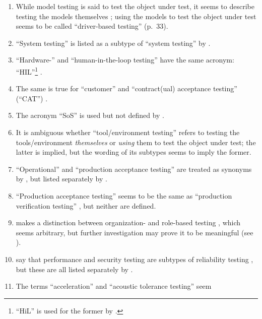 \begin{enumerate}
            \citeyearpar[p.~20]{IEEE2021}.
      \item While model testing is said to test the object under test,
            it seems to describe testing the models themselves
            \citet[p.~20]{Firesmith2015}; using the models to test the object
            under test seems to be called ``driver-based testing'' (p.~33).
      \item ``System testing'' is listed as a subtype of ``system testing'' by
            \citet[p.~23]{Firesmith2015}.
      \item ``Hardware-'' and ``human-in-the-loop testing'' have the same
            acronym: ``HIL''\footnote{``HiL'' is used for the former by
                  \citet[p.~2]{PreußeEtAl2012}.} \citep[p.~23]{Firesmith2015}.
      \item The same is true for ``customer'' and ``contract(ual) acceptance
            testing'' (``CAT'') \citep[p.~30]{Firesmith2015}.
      \item The acronym ``SoS'' is used but not defined by
            \citet[p.~23]{Firesmith2015}.
      \item It is ambiguous whether ``tool/environment testing'' refers to
            testing the tools/environment \emph{themselves} or \emph{using}
            them to test the object under test; the latter is implied, but the
            wording of its subtypes \citep[p.~25]{Firesmith2015} seems to imply
            the former.
      \item ``Operational'' and ``production acceptance testing'' are treated
            as synonyms by \citetISTQB{}, but listed separately by
            \citet[p.~30]{Firesmith2015}.
      \item ``Production acceptance testing'' \citep[p.~30]{Firesmith2015}
            seems to be the same as ``production verification testing''
            \citep[p.~22]{IEEE2022}, but neither are defined.
      \item \citeauthor{Firesmith2015} makes a distinction between organization-
            and role-based testing \citeyearpar[pp.~17,~37,~39]{Firesmith2015},
            which seems arbitrary, but further investigation may prove it to be
            meaningful (see ).
      \item \citeauthor{ISO_IEC2023a} say that performance and security testing
            are subtypes of reliability testing \citeyearpar{ISO_IEC2023a}, but
            these are all listed separately by \citet[p.~53]{Firesmith2015}.
      \item The terms ``acceleration'' and ``acoustic tolerance testing'' seem

\end{enumerate}
